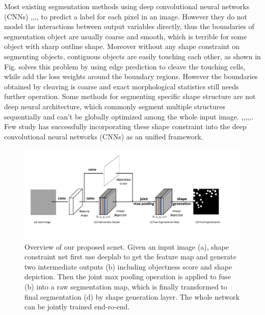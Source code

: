 \documentclass[10pt,twocolumn,letterpaper]{article}
\begin{document}
Most existing segmentation methods using deep convolutional neural networks (CNNs) \cite{Chen2014},\cite{Zhao2016},\cite{Arnab2016},\cite{Chen2016},\cite{Zheng} to predict a label for each pixel in an image.
However they do not model the interactions between output variables directly, thus the boundaries of segmentation object are usually coarse and smooth, which is terrible for some object with sharp outline shape.
Moreover without any shape constraint on segmenting objects, contiguous objects are easily touching each other, as shown in Fig.
\cite{Chen2016a} solves this problem by using edge prediction to cleave the touching cells, while \cite{Ronneberger2015} add the loss weights around the boundary regions.
However the boundaries obtained by cleaving is coarse and exact morphological statistics still needs further operation.
Some methods for segmenting specific shape structure are not deep neural architecture, which commonly segment multiple structures sequentially and can't be globally optimized among the whole input image. \cite{Gulshan2010},\cite{Sirinukunwattana2015},\cite{Royer2016},\cite{Veksler2008},\cite{Strekalovskiy2011},\cite{Gorelick2014}.
Few study has successfully incorporating these shape constraint into the deep convolutional neural networks (CNNs) as an unified framework.
\begin{figure}\label{Fig2}
\begin{center}
\includegraphics[width=6.8in]{Fig2.pdf}
\end{center}
   \caption{Overview of our proposed scnet. Given an input image (a), shape constraint net first use deeplab to get the feature map and generate two intermediate outputs (b) including objectness score and shape depiction. Then the joint max pooling operation is applied to fuse (b) into a raw segmentation map, which is finally transformed to final segmentation (d) by shape generation layer. The whole network can be jointly trained end-ro-end.}
\end{figure}
\end{document}
